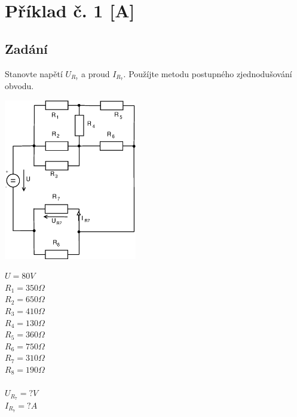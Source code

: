\documentclass[12pt,a4paper,titlepage,final]{article}
\begin{document}


	\def\author{Roman Blanco}
	\def\email{xblanc01@stud.fit.vutbr.cz}
	\def\projname{Semestrální projekt}

	



	\newpage
	\pagestyle{plain}
	\setcounter{page}{2}


	\section*{Příklad č. 1 [A]} \label{pr1}


	\subsection*{Zadání}

	Stanovte napětí $U_{R_{7}}$ a proud $I_{R_{7}}$. Použíjte metodu
	postupného zjednodušování obvodu. \\

	\begin{minipage}[c]{0.5\textwidth}
		\includegraphics[height=7cm]{img/Pr1_2012.eps}
		\label{fig:pr1_obvod}
	\end{minipage}
	\begin{minipage}[c]{0.25\textwidth}
		$U = 80 V$ \\
		$R_{1} = 350 \Omega$ \\
		$R_{2} = 650 \Omega$ \\
		$R_{3} = 410 \Omega$ \\
		$R_{4} = 130 \Omega$ \\
		$R_{5} = 360 \Omega$ \\
		$R_{6} = 750 \Omega$ \\
		$R_{7} = 310 \Omega$ \\
		$R_{8} = 190 \Omega$ \\
		\\
		$U_{R_{7}} = ? V$ \\
		$I_{R_{7}} = ? A$
	\end{minipage}
	\\
\end{document}
